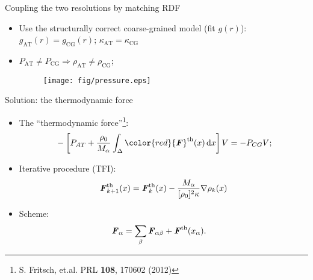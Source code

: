 \documentclass{beamer}
\newcommand{\redc}[1]{{\color{red} #1}}
\newcommand{\bluec}[1]{{\color{blue} #1}}
\newcommand{\vect}[1]{\textbf{\textit{#1}}}
\newcommand{\AT}{{\textrm{{AT}}}}
\newcommand{\CG}{{\textrm{CG}}}
\begin{document}
\begin{frame}{Coupling the two resolutions by matching RDF}
  \begin{itemize}
    \vfill
  \item <1-> Use the structurally correct coarse-grained model (fit $g(r)$): 
    \redc{$g_{\AT}(r) =  g_{\CG}(r)$}; \redc{$\kappa_{\AT} =  \kappa_{\CG}$}
    \vfill
  \item 
    \vfill
    \bluec{$P_{\AT}\neq P_{\CG} \Longrightarrow \rho_{\AT}\neq \rho_{\CG}$}; 
    \begin{figure}
      \texttt{[image: fig/pressure.eps]}
    \end{figure}    
  \end{itemize}
\end{frame}

\begin{frame}{Solution: the thermodynamic force}
  \begin{itemize}
  \item <1-> The ``thermodynamic force''\footnote{S. Fritsch, et.al. PRL \textbf{108}, 170602 (2012)}:
    \begin{align*}
      &-\left[P_{AT}+ \frac{\rho_{0}}{M_\alpha}\int_{\Delta} \redc{{\vect F}^\text{th}(x)}\,\text{d}x\right] V = -P_{CG}V; \\
    \end{align*}
  \item Iterative procedure (TFI):
    \begin{equation*}
      {\vect F}_{k+1}^{\textrm{th}}(x)={\vect F}_{k}^{\textrm{th}}(x)-\frac{M_{\alpha}}{[\rho_{0}]^{2}\kappa}\nabla\rho_{k}(x)
      \label{iter}
    \end{equation*}
  \item Scheme:
    \begin{align*}
      &{\vect F}_{\alpha}=\sum_{\beta}{\vect F}_{\alpha\beta}+{\vect F}^{\textrm{th}}(x_{\alpha}).
    \end{align*}
  \end{itemize}
\end{frame}
\end{document}

